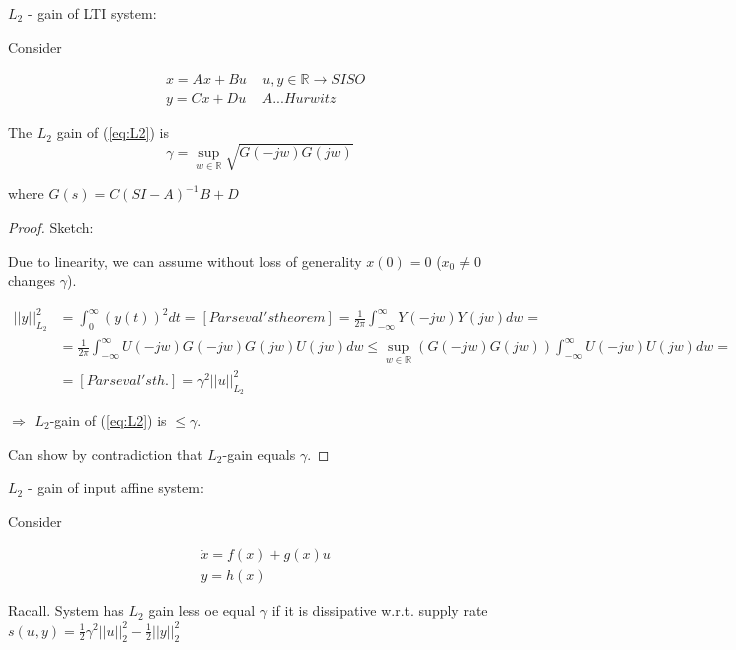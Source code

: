 $L_2$ - gain of LTI system:


Consider 

\begin{equation} \label{eq:L2}
\begin{split}
&x=Ax+Bu \ \ \ \ \ u,y\in\mathbb{R}\rightarrow SISO\\
&y=Cx+Du \ \ \ \ \ A ... Hurwitz
\end{split}
\end{equation}

\begin{Lemma}
The $L_2$ gain of (\ref{eq:L2}) is
$$\gamma=\sup_{w\in\mathbb{R}}\sqrt{G(-jw)G(jw)}$$

where $G(s)=C(SI-A)^{-1}B+D$
\begin{proof}
 Sketch:

 Due to linearity, we can assume without loss of generality $x(0)=0$ ($x_0 \ne 0$ changes $\gamma$).

 
 \begin{equation*}
  \begin{split}
   ||y||^2_{L_2} &=\int_0^\infty (y(t))^2dt = [Parseval's theorem]=\frac{1}{2\pi}\int_{-\infty}^\infty Y(-jw)Y(jw)dw=\\
                 &=\frac{1}{2\pi}\int_{-\infty}^\infty U(-jw)G(-jw)G(jw)U(jw)dw\le\sup_{w\in\mathbb{R}} (G(-jw)G(jw))\int_{-\infty}^\infty U(-jw)U(jw)dw=\\
                 &=[Parseval's th.] = \gamma^2 ||u||_{L_2}^2
  \end{split}
 \end{equation*}

 $\Rightarrow$ $L_2$-gain of (\ref{eq:L2}) is $\le\gamma$.

 Can show by contradiction that $L_2$-gain equals $\gamma$.
\end{proof}
\end{Lemma}


$L_2$ - gain of input affine system:

Consider

\begin{equation} \label{eq:L2af}
\begin{split}
&\dot x = f(x) +g(x)u\\
&y = h(x)
\end{split}
\end{equation}

Racall. System has $L_2$ gain less oe equal $\gamma$ if it is dissipative w.r.t. supply
rate $s(u,y)=\frac{1}{2}\gamma^2||u||^2_2-\frac{1}{2}||y||_2^2$

